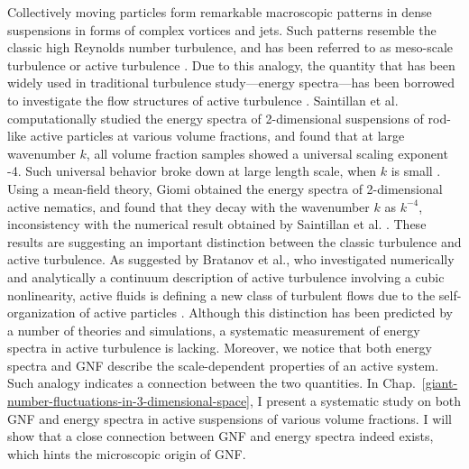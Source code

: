 Collectively moving particles form remarkable macroscopic patterns in dense suspensions in forms of complex vortices and jets. Such patterns resemble the classic high Reynolds number turbulence, and has been referred to as meso-scale turbulence or active turbulence \cite{Wensink2012}. Due to this analogy, the quantity that has been widely used in traditional turbulence study---energy spectra---has been borrowed to investigate the flow structures of active turbulence \cite{Ishikawa2011, Saintillan2012, Bratanov2015, Giomi2015, Bardfalvy2019, Linkmann2019, Chatterjee2019, Skultety2020, Peng2020}. Saintillan et al. computationally studied the energy spectra of 2-dimensional suspensions of rod-like active particles at various volume fractions, and found that at large wavenumber $k$, all volume fraction samples showed a universal scaling exponent -4. Such universal behavior broke down at large length scale, when $k$ is small \cite{Saintillan2012}.
Using a mean-field theory, Giomi obtained the energy spectra of 2-dimensional active nematics, and found that they decay with the wavenumber $k$ as $k^{-4}$, inconsistency with the numerical result obtained by Saintillan et al. \cite{Giomi2015}. These results are suggesting an important distinction between the classic turbulence and active turbulence. As suggested by Bratanov et al., who investigated numerically and analytically a continuum description of active turbulence involving a cubic nonlinearity, active fluids is defining a new class of turbulent flows due to the self-organization of active particles \cite{Bratanov2015}. Although this distinction has been predicted by a number of theories and simulations, a systematic measurement of energy spectra in active turbulence is lacking. Moreover, we notice that both energy spectra and GNF describe the scale-dependent properties of an active system. Such analogy indicates a connection between the two quantities. In Chap.~\ref{giant-number-fluctuations-in-3-dimensional-space}, I present a systematic study on both GNF and energy spectra in active suspensions of various volume fractions. I will show that a close connection between GNF and energy spectra indeed exists, which hints the microscopic origin of GNF.
